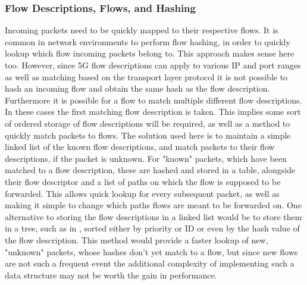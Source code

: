 \subsubsection{Flow Descriptions, Flows, and Hashing}

Incoming packets need to be quickly mapped to their respective flows. It is common in network environments to perform flow hashing, in order to quickly lookup which flow incoming packets belong to. This approach makes sense here too. However, since 5G flow descriptions can apply to various IP and port ranges as well as matching based on the transport layer protocol it is not possible to hash an incoming flow and obtain the same hash as the flow description. Furthermore it is possible for a flow to match multiple different flow descriptions. In these cases the first matching flow description is taken. This implies some sort of ordered storage of flow descriptions will be required, as well as a method to quickly match packets to flows. The solution used here is to maintain a simple linked list of the known flow descriptions, and match packets to their flow descriptions, if the packet is unknown. For "known" packets, which have been matched to a flow description, these are hashed and stored in a table, alongside their flow descriptor and a list of paths on which the flow is supposed to be forwarded. This allows quick lookup for every subsequent packet, as well as making it simple to change which paths flows are meant to be forwarded on. One alternative to storing the flow descriptions in a linked list would be to store them in a tree, such as in \cite{flow-lookup-trees-phd}, sorted either by priority or ID or even by the hash value of the flow description. This method would provide a faster lookup of new, "unknown" packets, whose hashes don't yet match to a flow, but since new flows are not such a frequent event the additional complexity of implementing such a data structure may not be worth the gain in performance.

